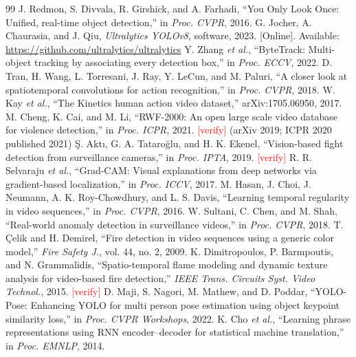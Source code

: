 \documentclass[conference]{IEEEtran}
\newcommand{\verify}{\textcolor{red}{[verify]}}
\begin{document}
\begin{thebibliography}{99}
 J. Redmon, S. Divvala, R. Girshick, and A. Farhadi, ``You Only Look Once: Unified, real-time object detection,'' in \emph{Proc. CVPR}, 2016.
 G. Jocher, A. Chaurasia, and J. Qiu, \emph{Ultralytics YOLOv8}, software, 2023. [Online]. Available: \url{https://github.com/ultralytics/ultralytics}
 Y. Zhang \emph{et al.}, ``ByteTrack: Multi-object tracking by associating every detection box,'' in \emph{Proc. ECCV}, 2022.
 D. Tran, H. Wang, L. Torresani, J. Ray, Y. LeCun, and M. Paluri, ``A closer look at spatiotemporal convolutions for action recognition,'' in \emph{Proc. CVPR}, 2018.
 W. Kay \emph{et al.}, ``The Kinetics human action video dataset,'' arXiv:1705.06950, 2017.
 M. Cheng, K. Cai, and M. Li, ``RWF-2000: An open large scale video database for violence detection,'' in \emph{Proc. ICPR}, 2021. \verify{} (arXiv 2019; ICPR 2020 published 2021)
 \c{S}. Akt\i, G. A. Tataro\u{g}lu, and H. K. Ekenel, ``Vision-based fight detection from surveillance cameras,'' in \emph{Proc. IPTA}, 2019. \verify{}
 R. R. Selvaraju \emph{et al.}, ``Grad-CAM: Visual explanations from deep networks via gradient-based localization,'' in \emph{Proc. ICCV}, 2017.
 M. Hasan, J. Choi, J. Neumann, A. K. Roy-Chowdhury, and L. S. Davis, ``Learning temporal regularity in video sequences,'' in \emph{Proc. CVPR}, 2016.
 W. Sultani, C. Chen, and M. Shah, ``Real-world anomaly detection in surveillance videos,'' in \emph{Proc. CVPR}, 2018.
 T. \c{C}elik and H. Demirel, ``Fire detection in video sequences using a generic color model,'' \emph{Fire Safety J.}, vol. 44, no. 2, 2009.
 K. Dimitropoulos, P. Barmpoutis, and N. Grammalidis, ``Spatio-temporal flame modeling and dynamic texture analysis for video-based fire detection,'' \emph{IEEE Trans. Circuits Syst. Video Technol.}, 2015. \verify{}
 D. Maji, S. Nagori, M. Mathew, and D. Poddar, ``YOLO-Pose: Enhancing YOLO for multi person pose estimation using object keypoint similarity loss,'' in \emph{Proc. CVPR Workshops}, 2022.
 K. Cho \emph{et al.}, ``Learning phrase representations using RNN encoder--decoder for statistical machine translation,'' in \emph{Proc. EMNLP}, 2014.
\end{thebibliography}
\end{document}
